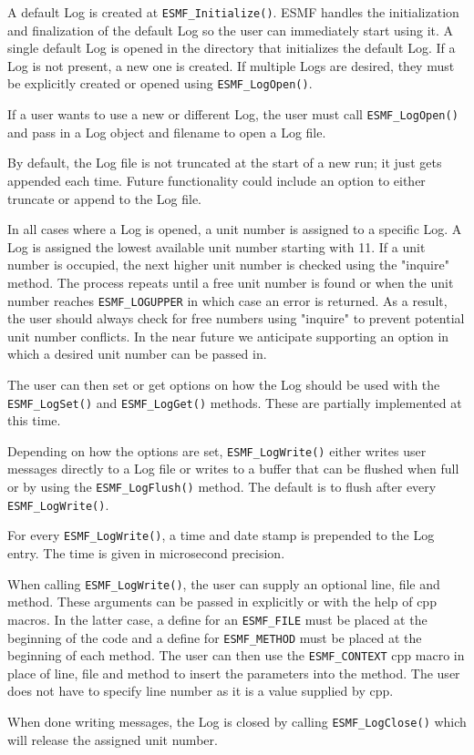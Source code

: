 

A default Log is created at {\tt ESMF\_Initialize()}.  ESMF handles 
the initialization and finalization of the default Log so the user 
can immediately start using it.  A single default Log is opened 
in the directory that initializes the default Log.  If a Log is 
not present, a new one is created.  If multiple Logs are 
desired, they must be explicitly created or opened using 
{\tt ESMF\_LogOpen()}.

If a user wants to use a new or different Log, the user must call
{\tt ESMF\_LogOpen()} and pass in a Log object and filename to open a Log 
file.
 
By default, the Log file is not truncated at the start of a new run; it just
gets appended each time.  Future functionality could include an option to
either truncate or append to the Log file. 

In all cases where a Log is opened, a unit number is assigned to a specific
Log.  A Log is assigned the lowest available unit number starting with
11.  If a unit number is occupied, the next higher unit number is 
checked using the "inquire" method.  The process repeats until a free unit 
number is found or when the unit number reaches {\tt ESMF\_LOGUPPER} in 
which case an error is returned.  As a result, the user should always check
for free numbers using "inquire" to prevent potential unit number conflicts.
In the near future we anticipate supporting an option in which a desired
unit number can be passed in.

The user can then set or get options on how the Log should be used 
with the {\tt ESMF\_LogSet()} and {\tt ESMF\_LogGet()} methods.  These are 
partially implemented at this time. 

Depending on how the options are set, {\tt ESMF\_LogWrite()} either writes user
messages directly to a Log file or writes to a buffer that can be flushed when 
full or by using the {\tt ESMF\_LogFlush()} method.  The default is to flush 
after every {\tt ESMF\_LogWrite()}.

For every {\tt ESMF\_LogWrite()}, a time and date stamp is prepended to the
Log entry.  The time is given in microsecond precision.

When calling {\tt ESMF\_LogWrite()}, the user can supply an optional line,
file and method.  These arguments can be passed in explicitly or with the help
of cpp macros.  In the latter case, a define for an {\tt ESMF\_FILE} must be 
placed at the beginning of the code and a define for {\tt ESMF\_METHOD} must
be placed at the beginning of each method.  The user can then use the
{\tt ESMF\_CONTEXT} cpp macro in place of line, file and method to insert the 
parameters into the method.  The user does not have to specify line number as
it is a value supplied by cpp.

When done writing messages, the Log is closed by calling 
{\tt ESMF\_LogClose()} which will release the assigned unit number.




